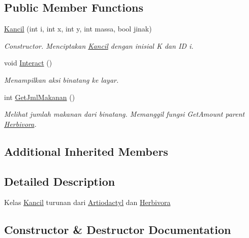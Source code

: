\subsection*{Public Member Functions}
\begin{DoxyCompactItemize}
\item 
\hyperlink{classKancil_abed0545d9b1d8afddea3f945d92563da}{Kancil} (int i, int x, int y, int massa, bool jinak)
\begin{DoxyCompactList}\small\item\em Constructor. Menciptakan \hyperlink{classKancil}{Kancil} dengan inisial \textquotesingle{}K\textquotesingle{} dan ID i. \end{DoxyCompactList}\item 
void \hyperlink{classKancil_ac24b68250ff0d8426aef45c34ff8cce0}{Interact} ()\hypertarget{classKancil_ac24b68250ff0d8426aef45c34ff8cce0}{}\label{classKancil_ac24b68250ff0d8426aef45c34ff8cce0}

\begin{DoxyCompactList}\small\item\em Menampilkan aksi binatang ke layar. \end{DoxyCompactList}\item 
int \hyperlink{classKancil_ab958e9fa65f83d505aaba333b4119790}{Get\+Jml\+Makanan} ()
\begin{DoxyCompactList}\small\item\em Melihat jumlah makanan dari binatang. Memanggil fungsi Get\+Amount parent \hyperlink{classHerbivora}{Herbivora}. \end{DoxyCompactList}\end{DoxyCompactItemize}
\subsection*{Additional Inherited Members}


\subsection{Detailed Description}
Kelas \hyperlink{classKancil}{Kancil} turunan dari \hyperlink{classArtiodactyl}{Artiodactyl} dan \hyperlink{classHerbivora}{Herbivora} 

\subsection{Constructor \& Destructor Documentation}
